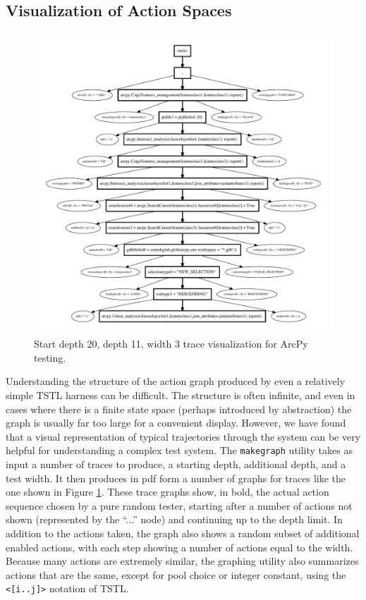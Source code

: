 \subsection{Visualization of Action Spaces}

\begin{figure}
\includegraphics[width=\columnwidth]{shortgraph}
\caption{Start depth 20, depth 11, width 3 trace visualization for ArcPy testing.}
\label{fig:actions}
\end{figure}

Understanding the structure of the action graph produced by even a relatively simple TSTL harness can be difficult.  The structure is often infinite, and even in cases where there is a finite state space (perhaps introduced by abstraction) the graph is usually far too large for a convenient display.  However, we have found that a visual representation of typical trajectories through the system can be very helpful for understanding a complex test system.  The {\tt makegraph} utility takes as input a number of traces to produce, a starting depth, additional depth, and a test width.  It then produces in pdf form a number of graphs for traces like the one shown in Figure \ref{fig:actions}.  These trace graphs show, in bold, the actual action sequence chosen by a pure random tester, starting after a number of actions not shown (represented by the ``...'' node) and continuing up to the depth limit.  In addition to the actions taken, the graph also shows a random subset of additional enabled actions, with each step showing a number of actions equal to the width.  Because many actions are extremely similar, the graphing utility also summarizes actions that are the same, except for pool choice or integer constant, using the {\tt <[i..j]>} notation of TSTL.

